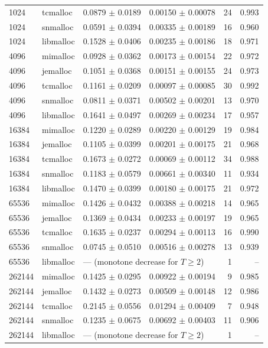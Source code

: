 \begin{table}[!htbp]
\begin{tabular}{llrrrr}
1024 & tcmalloc & 0.0879 $\pm$ 0.0189 & 0.00150 $\pm$ 0.00078 & 24 & 0.993 \\
1024 & snmalloc & 0.0591 $\pm$ 0.0394 & 0.00335 $\pm$ 0.00189 & 16 & 0.960 \\
1024 & libmalloc & 0.1528 $\pm$ 0.0406 & 0.00235 $\pm$ 0.00186 & 18 & 0.971 \\
4096 & mimalloc & 0.0928 $\pm$ 0.0362 & 0.00173 $\pm$ 0.00154 & 22 & 0.972 \\
4096 & jemalloc & 0.1051 $\pm$ 0.0368 & 0.00151 $\pm$ 0.00155 & 24 & 0.973 \\
4096 & tcmalloc & 0.1161 $\pm$ 0.0209 & 0.00097 $\pm$ 0.00085 & 30 & 0.992 \\
4096 & snmalloc & 0.0811 $\pm$ 0.0371 & 0.00502 $\pm$ 0.00201 & 13 & 0.970 \\
4096 & libmalloc & 0.1641 $\pm$ 0.0497 & 0.00269 $\pm$ 0.00234 & 17 & 0.957 \\
16384 & mimalloc & 0.1220 $\pm$ 0.0289 & 0.00220 $\pm$ 0.00129 & 19 & 0.984 \\
16384 & jemalloc & 0.1105 $\pm$ 0.0399 & 0.00201 $\pm$ 0.00175 & 21 & 0.968 \\
16384 & tcmalloc & 0.1673 $\pm$ 0.0272 & 0.00069 $\pm$ 0.00112 & 34 & 0.988 \\
16384 & snmalloc & 0.1183 $\pm$ 0.0579 & 0.00661 $\pm$ 0.00340 & 11 & 0.934 \\
16384 & libmalloc & 0.1470 $\pm$ 0.0399 & 0.00180 $\pm$ 0.00175 & 21 & 0.972 \\
65536 & mimalloc & 0.1426 $\pm$ 0.0432 & 0.00388 $\pm$ 0.00218 & 14 & 0.965 \\
65536 & jemalloc & 0.1369 $\pm$ 0.0434 & 0.00233 $\pm$ 0.00197 & 19 & 0.965 \\
65536 & tcmalloc & 0.1635 $\pm$ 0.0237 & 0.00294 $\pm$ 0.00113 & 16 & 0.990 \\
65536 & snmalloc & 0.0745 $\pm$ 0.0510 & 0.00516 $\pm$ 0.00278 & 13 & 0.939 \\
65536 & libmalloc & \multicolumn{2}{l}{--- (monotone decrease for $T \ge 2$)} & 1 & -- \\
262144 & mimalloc & 0.1425 $\pm$ 0.0295 & 0.00922 $\pm$ 0.00194 & 9 & 0.985 \\
262144 & jemalloc & 0.1432 $\pm$ 0.0273 & 0.00509 $\pm$ 0.00148 & 12 & 0.986 \\
262144 & tcmalloc & 0.2145 $\pm$ 0.0556 & 0.01294 $\pm$ 0.00409 & 7 & 0.948 \\
262144 & snmalloc & 0.1235 $\pm$ 0.0675 & 0.00692 $\pm$ 0.00403 & 11 & 0.906 \\
262144 & libmalloc & \multicolumn{2}{l}{--- (monotone decrease for $T \ge 2$)} & 1 & -- \\
\bottomrule
\end{tabular}
\end{table}
